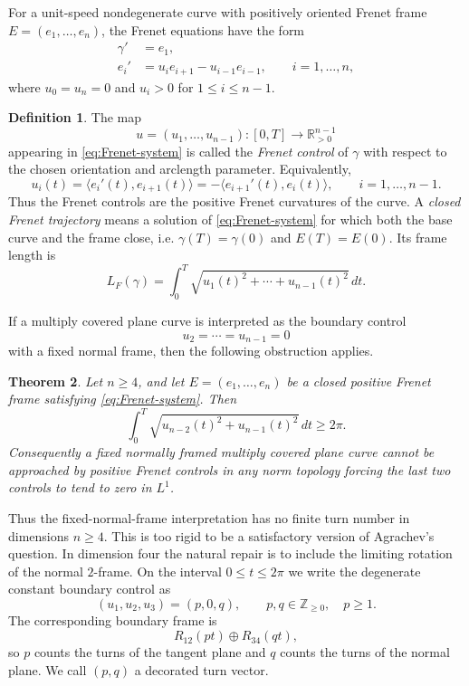 \documentclass[11pt,reqno]{amsart}
\newtheorem{theorem}{Theorem}[section]
\theoremstyle{definition}
\newtheorem{definition}[theorem]{Definition}
\theoremstyle{remark}
\newcommand{\R}{\mathbb R}
\begin{document}
For a unit-speed nondegenerate curve with positively oriented Frenet frame
$E=(e_1,\ldots,e_n)$, the Frenet equations have the form
\begin{equation}\label{eq:Frenet-system}
\begin{split}
        \gamma'&=e_1,\\
        e_i'&=u_i e_{i+1}-u_{i-1}e_{i-1},\qquad i=1,\ldots,n,
\end{split}
\end{equation}
where $u_0=u_n=0$ and $u_i>0$ for $1\le i\le n-1$.

\begin{definition}\label{def:Frenet-control}
The map
\[
        u=(u_1,\ldots,u_{n-1}):[0,T]\to \R_{>0}^{n-1}
\]
appearing in \eqref{eq:Frenet-system} is called the \emph{Frenet control} of
$\gamma$ with respect to the chosen orientation and arclength parameter.  Equivalently,
\[
        u_i(t)=\langle e_i'(t),e_{i+1}(t)\rangle
        =-\langle e_{i+1}'(t),e_i(t)\rangle,
        \qquad i=1,\ldots,n-1 .
\]
Thus the Frenet controls are the positive Frenet curvatures of the curve.  A
\emph{closed Frenet trajectory} means a solution of \eqref{eq:Frenet-system} for
which both the base curve and the frame close, i.e.
$\gamma(T)=\gamma(0)$ and $E(T)=E(0)$.  Its frame length is
\[
        L_F(\gamma)=\int_0^T \sqrt{u_1(t)^2+\cdots+u_{n-1}(t)^2}\,dt .
\]
\end{definition}

If a multiply covered plane curve is interpreted as the boundary control
\begin{equation}\label{eq:fixed-boundary}
        u_2=\cdots=u_{n-1}=0
\end{equation}
with a fixed normal frame, then the following obstruction applies.

\begin{theorem}\label{thm:control-obstruction-intro}
Let $n\ge4$, and let $E=(e_1,\ldots,e_n)$ be a closed positive Frenet frame
satisfying \eqref{eq:Frenet-system}.  Then
\begin{equation}\label{eq:last-controls-intro}
        \int_0^T\sqrt{u_{n-2}(t)^2+u_{n-1}(t)^2}\,dt\ge2\pi .
\end{equation}
Consequently a fixed normally framed multiply covered plane curve cannot be
approached by positive Frenet controls in any norm topology forcing the last two controls
to tend to zero in $L^1$.
\end{theorem}

Thus the fixed-normal-frame interpretation has no finite turn number in dimensions
$n\ge4$.  This is too rigid to be a satisfactory version of Agrachev's question.  In
dimension four the natural repair is to include the limiting rotation of the normal
$2$-frame.  On the interval $0\le t\le2\pi$ we write the degenerate constant boundary
control as
\begin{equation}\label{eq:turn-vector-boundary-intro}
        (u_1,u_2,u_3)=(p,0,q),\qquad p,q\in\mathbb Z_{\ge0},\quad p\ge1.
\end{equation}
The corresponding boundary frame is
\[
        R_{12}(pt)\oplus R_{34}(qt),
\]
so $p$ counts the turns of the tangent plane and $q$ counts the turns of the normal
plane.  We call $(p,q)$ a decorated turn vector.
\end{document}
